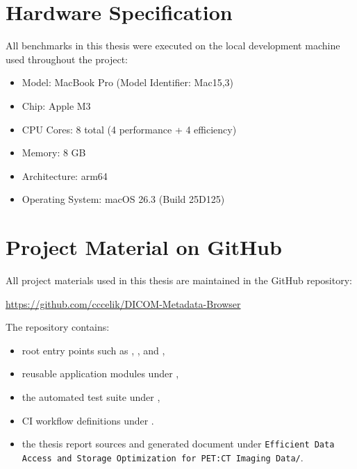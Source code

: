 \section{Hardware Specification}
All benchmarks in this thesis were executed on the local development machine used throughout the project:
\begin{itemize}
\item Model: MacBook Pro (Model Identifier: Mac15,3)
\item Chip: Apple M3
\item CPU Cores: 8 total (4 performance + 4 efficiency)
\item Memory: 8 GB
\item Architecture: arm64
\item Operating System: macOS 26.3 (Build 25D125)
\end{itemize}

\section{Project Material on GitHub}
All project materials used in this thesis are maintained in the GitHub repository:
\begin{center}
\url{https://github.com/cccelik/DICOM-Metadata-Browser}
\end{center}

The repository contains:
\begin{itemize}
\item root entry points such as , , and ,
\item reusable application modules under ,
\item the automated test suite under ,
\item CI workflow definitions under .
\item the thesis report sources and generated document under \texttt{Efficient Data Access and Storage Optimization for}\linebreak[1]\texttt{ PET:CT Imaging Data/}.
\end{itemize}
